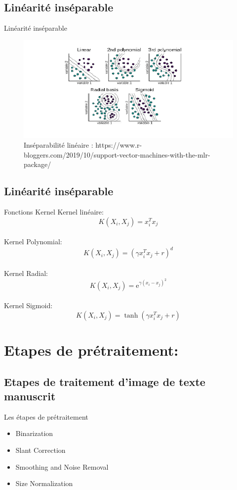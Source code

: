 \documentclass{beamer}
\begin{document}
\subsection{Linéarité inséparable}
\begin{frame}{Linéarité inséparable}
\begin{figure}[H]
    \includegraphics[width=\linewidth]{images/svm_non_linear.png}
    \caption{Inséparabilité linéaire : https://www.r-bloggers.com/2019/10/support-vector-machines-with-the-mlr-package/}
    \label{fig:L1}
\end{figure}
\end{frame}
\subsection{Linéarité inséparable}
\begin{frame}{Fonctions Kernel}
Kernel linéaire: $$  K(X_{i},X_{j})=x_i^T x_j$$\\
Kernel Polynomial:  $$K(X_i,X_j ) = (\gamma x_i^T x_j+r)^d$$\\
Kernel Radial: $$K(X_i,X_j ) = \mathrm{e}^{\gamma(x_i-x_j )^2}$$\\
Kernel Sigmoid: $$K(X_i,X_j )= \tanh{(\gamma x_i^T x_j+r)}$$
\end{frame}


\section{Etapes de prétraitement:}
\subsection{Etapes de traitement d'image de texte manuscrit}
\begin{frame}{Les étapes de prétraitement} 
\begin{itemize}
		\item Binarization 
		\item Slant Correction
		\item Smoothing and Noise Removal 
		\item Size Normalization
\end{itemize}
\end{frame}
\end{document}
